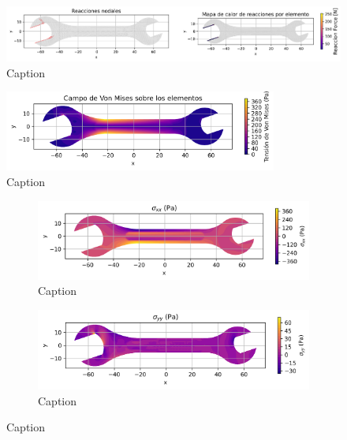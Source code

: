 \documentclass{article}  %
\begin{document}
\begin{figure}[H]
  \centering
  \includegraphics[width=1\textwidth]{GRAFICOS/Case c_deformada_reacciones.png}
  \caption{Caption}
  \label{fig:principal}
\end{figure}

\begin{figure}[H]
  \centering
  \includegraphics[width=0.8\textwidth]{GRAFICOS/Case c_von_mises.png}
  \caption{Caption}
  \label{fig:principal}
\end{figure}

\begin{figure}[H]
  \centering
  \begin{subfigure}[t]{0.49\textwidth}
    \centering
    \includegraphics[width=\textwidth]{GRAFICOS/Case c - sigma_xx.png}
    \caption{Caption}
    \label{fig:deformada_reacciones}
  \end{subfigure}
  \hfill
  \begin{subfigure}[t]{0.49\textwidth}
    \centering
    \includegraphics[width=\textwidth]{GRAFICOS/Case c - sigma_yy.png}
    \caption{Caption}
    \label{fig:von_mises}
  \end{subfigure}
  \caption{Caption}
  \label{fig:analisis_estructural}
\end{figure}
\end{document}
